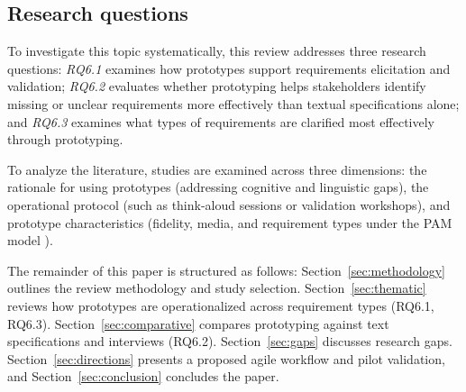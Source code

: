\subsection{Research questions}
To investigate this topic systematically, this review addresses three research questions: \textit{RQ6.1} examines how prototypes support requirements elicitation and validation; \textit{RQ6.2} evaluates whether prototyping helps stakeholders identify missing or unclear requirements more effectively than textual specifications alone; and \textit{RQ6.3} examines what types of requirements are clarified most effectively through prototyping.

To analyze the literature, studies are examined across three dimensions: the rationale for using prototypes (addressing cognitive and linguistic gaps), the operational protocol (such as think-aloud sessions or validation workshops), and prototype characteristics (fidelity, media, and requirement types under the PAM model \cite{bjarnason2023empirically}).

The remainder of this paper is structured as follows: Section~\ref{sec:methodology} outlines the review methodology and study selection. Section~\ref{sec:thematic} reviews how prototypes are operationalized across requirement types (RQ6.1, RQ6.3). Section~\ref{sec:comparative} compares prototyping against text specifications and interviews (RQ6.2). Section~\ref{sec:gaps} discusses research gaps. Section~\ref{sec:directions} presents a proposed agile workflow and pilot validation, and Section~\ref{sec:conclusion} concludes the paper.

